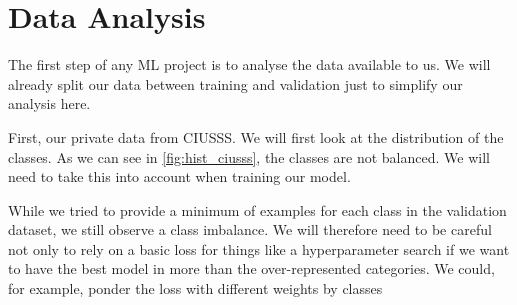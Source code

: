 \documentclass[11pt]{article}
\begin{document}
\section{Data Analysis}

    The first step of any ML project is to analyse the data available to us. We will already split our data between
    training and validation just to simplify our analysis here.

    First, our private data from CIUSSS. We will first look at the distribution of the classes. As we can see in
\ref{fig:hist_ciusss}, the classes are not balanced. We will need to take this into account when training our model.


While we tried to provide a minimum of examples for each class in the validation dataset, we still observe a class imbalance.
We will therefore need to be careful not only to rely on a basic loss for things like a hyperparameter search if we want to
have the best model in more than the over-represented categories. We could, for example, ponder the loss with different weights
by classes
\end{document}
